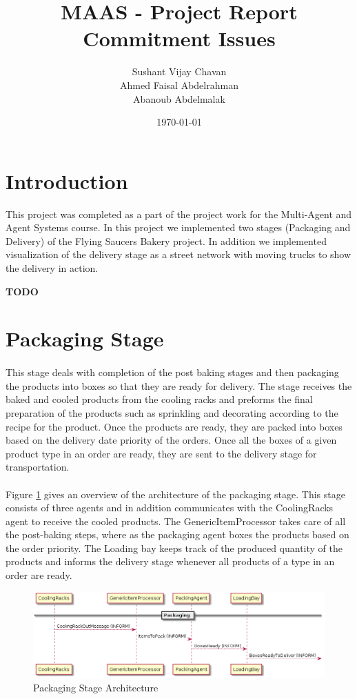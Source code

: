\documentclass[11pt, a4paper]{article}
\title{MAAS - Project Report \\Commitment Issues}
\author{Sushant Vijay Chavan\\Ahmed Faisal Abdelrahman\\Abanoub Abdelmalak}
\date{\today}
\begin{document}
\maketitle
\newpage
\tableofcontents{}
\newpage

\section{Introduction}
This project was completed as a part of the project work for the Multi-Agent and Agent Systems course. In this project we implemented two stages (Packaging and Delivery) of the Flying Saucers Bakery project. In addition we implemented visualization of the delivery stage as a street network with moving trucks to show the delivery in action. 

\textbf{TODO}

\section{Packaging Stage}\label{PackagingStage}
\paragraph{}
This stage deals with completion of the post baking stages and then packaging the products into boxes so that they are ready for delivery. The stage receives the baked and cooled products from the cooling racks and preforms the final preparation of the products such as sprinkling and decorating according to the recipe for the product. Once the products are ready, they are packed into boxes based on the delivery date priority of the orders. Once all the boxes of a given product type in an order are ready, they are sent to the delivery stage for transportation.

\paragraph{}
Figure \ref{PackagingArchitecture} gives an overview of the architecture of the packaging stage. This stage consists of three agents and in addition communicates with the CoolingRacks agent to receive the cooled products. The GenericItemProcessor takes care of all the post-baking steps, where as the packaging agent boxes the products based on the order priority. The Loading bay keeps track of the produced quantity of the products and informs the delivery stage whenever all products of a type in an order are ready.

\begin{figure}[h!]
	\centering
	\includegraphics[width=\textwidth]{../Architecture/Architecture_Packaging.png}
	\caption{Packaging Stage Architecture}
	\label{PackagingArchitecture}
\end{figure}
\end{document}
